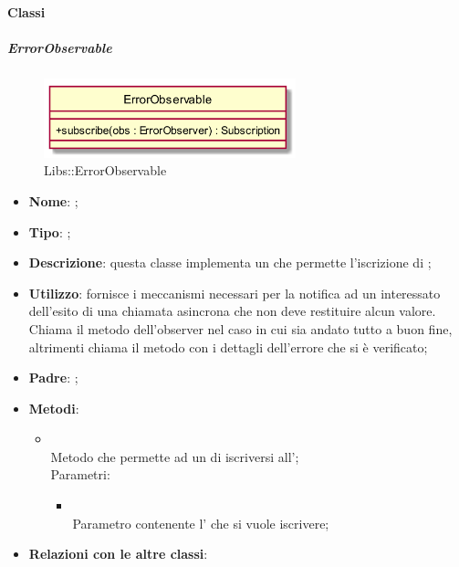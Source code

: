 \paragraph{Classi}
\hypertarget{ErrorObservable_label}{\subparagraph{ErrorObservable}}
\begin{figure}[h]
	\centering
	\includegraphics[width=0.65\textwidth,height=\textheight,keepaspectratio]{images/ClassErrorObservable.png}
	\caption{Libs::ErrorObservable}
\end{figure}
\begin{itemize}
	\item \textbf{Nome}: ;
	\item \textbf{Tipo}: ;
	\item \textbf{Descrizione}: questa classe implementa un  che permette l'iscrizione di ;
	\item \textbf{Utilizzo}: fornisce i meccanismi necessari per la notifica ad un  interessato dell'esito di una chiamata asincrona che non deve restituire alcun valore. Chiama il metodo  dell'observer nel caso in cui sia andato tutto a buon fine, altrimenti chiama il metodo  con i dettagli dell'errore che si è verificato;
	\item \textbf{Padre}: ;
	\item \textbf{Metodi}:
	\begin{itemize}
		\item[]  \\		Metodo che permette ad un  di iscriversi all';\\
		Parametri:
		\begin{itemize}
			\item {} \\
			Parametro contenente l' che si vuole iscrivere;
		\end{itemize}
	\end{itemize}
	\item \textbf{Relazioni con le altre classi}:
	\begin{itemize}

\end{itemize}
\end{itemize}

